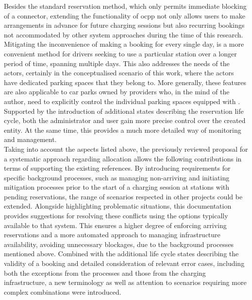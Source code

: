 Besides the standard reservation method, which only permits immediate blocking of a connector, extending the functionality of \acrshort{ocpp} not only allows users to make arrangements in advance for future charging sessions but also recurring bookings not accommodated by other system approaches during the time of this research.
Mitigating the inconvenience of making a booking for every single day, is a more convenient method for drivers seeking to use a particular station over a longer period of time, spanning multiple days. This also addresses the needs of the actors, certainly in the conceptualised scenario of this work, where the actors have dedicated parking spaces that they belong to.
More generally, these features are also applicable to car parks owned by providers who, in the mind of the author, need to explicitly control the individual parking spaces equipped with .
Supported by the introduction of additional states describing the reservation life cycle, both the administrator and user gain more precise control over the created entity. At the same time, this provides a much more detailed way of monitoring and management.  \\
\noindent Taking into account the aspects listed above, the previously reviewed proposal for a systematic approach regarding  allocation allows the following contributions in terms of supporting the existing references.
By introducing requirements for specific background processes, such as managing non-arriving  and initiating mitigation processes prior to the start of a charging session at stations with pending reservations, the range of scenarios respected in other projects could be extended.
Alongside highlighting problematic situations, this documentation provides suggestions for resolving these conflicts using the options typically available to that system.
This ensures a higher degree of enforcing arriving reservations and a more automated approach to managing infrastructure availability, avoiding unnecessary blockages, due to the background processes mentioned above. 
Combined with the additional life cycle states describing the validity of a booking and detailed consideration of relevant error cases, including both the exceptions from the processes and those from the charging infrastructure, a new terminology as well as attention to scenarios requiring more complex combinations were introduced.
